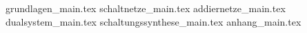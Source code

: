 
{grundlagen_main.tex}
{schaltnetze_main.tex}
{addiernetze_main.tex}
{dualsystem_main.tex}
{schaltungssynthese_main.tex}
{anhang_main.tex}